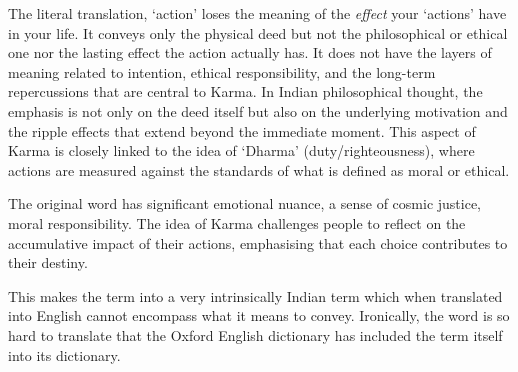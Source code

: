 \documentclass{article}
\begin{document}
The literal translation, `action' loses the meaning of the \textit{effect} your `actions' have in your life. It conveys only the physical deed but not the philosophical or ethical one nor the lasting effect the action actually has. It does not have the layers of meaning related to intention, ethical responsibility, and the long-term repercussions that are central to Karma. In Indian philosophical thought, the emphasis is not only on the deed itself but also on the underlying motivation and the ripple effects that extend beyond the immediate moment. This aspect of Karma is closely linked to the idea of `Dharma' (duty/righteousness), where actions are measured against the standards of what is defined as moral or ethical.

The original word has significant emotional nuance, a sense of cosmic justice, moral responsibility. The idea of Karma challenges people to reflect on the accumulative impact of their actions, emphasising that each choice contributes to their destiny.

This makes the term into a very intrinsically Indian term which when translated into English cannot encompass what it means to convey. Ironically, the word is so hard to translate that the Oxford English dictionary has included the term itself into its dictionary.
\end{document}
